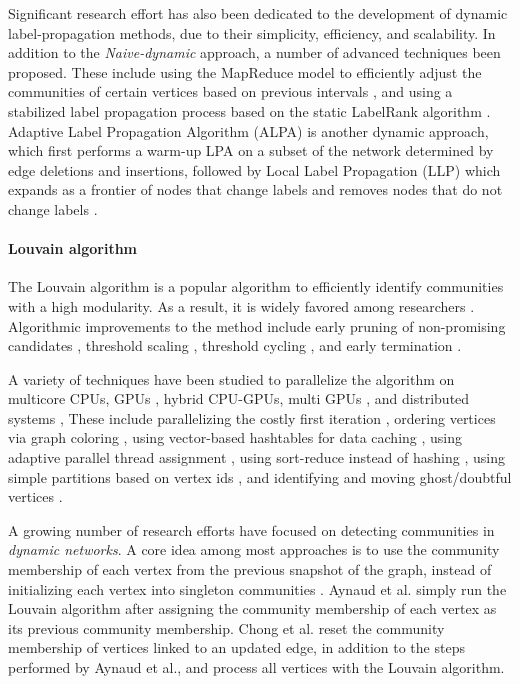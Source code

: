 Significant research effort has also been dedicated to the development of dynamic label-propagation methods, due to their simplicity, efficiency, and scalability. In addition to the \textit{Naive-dynamic} approach, a number of advanced techniques been proposed. These include using the MapReduce model to efficiently adjust the communities of certain vertices based on previous intervals \cite{com-li17}, and using a stabilized label propagation process based on the static LabelRank algorithm \cite{com-xie13}. Adaptive Label Propagation Algorithm (ALPA) is another dynamic approach, which first performs a warm-up LPA on a subset of the network determined by edge deletions and insertions, followed by Local Label Propagation (LLP) which expands as a frontier of nodes that change labels and removes nodes that do not change labels \cite{com-han17}.





\paragraph{Louvain algorithm \cite{com-blondel08}}

The Louvain algorithm is a popular algorithm to efficiently identify communities with a high modularity. As a result, it is widely favored among researchers \cite{com-lancichinetti09}. Algorithmic improvements to the \Lou{} method include early pruning of non-promising candidates \cite{com-halappanavar17}, threshold scaling \cite{com-naim17, com-halappanavar17}, threshold cycling \cite{com-ghosh18}, and early termination \cite{com-ghosh18}.

A variety  of techniques have been studied to parallelize the \Lou{} algorithm on multicore CPUs, GPUs \cite{com-cheong13}, hybrid CPU-GPUs, multi GPUs \cite{com-cheong13, com-bhowmick22}, and distributed systems \cite{com-bhowmick22}, These include parallelizing the costly first iteration \cite{com-wickramaarachchi14}, ordering vertices via graph coloring \cite{com-halappanavar17}, using vector-based hashtables for data caching \cite{com-halappanavar17}, using adaptive parallel thread assignment \cite{com-naim17}, using sort-reduce instead of hashing \cite{com-cheong13}, using simple partitions based on vertex ids \cite{com-cheong13, com-ghosh18}, and identifying and moving ghost/doubtful vertices \cite{com-bhowmick22}.

A growing number of research efforts have focused on detecting communities in \textit{dynamic networks}. A core idea among most approaches is to use the community membership of each vertex from the previous snapshot of the graph, instead of initializing each vertex into singleton communities \cite{com-aynaud10, com-chong13, com-cordeiro16, com-zarayeneh21}. Aynaud et al. \cite{com-aynaud10} simply run the Louvain algorithm after assigning the community membership of each vertex as its previous community membership. Chong et al. \cite{com-chong13} reset the community membership of vertices linked to an updated edge, in addition to the steps performed by Aynaud et al., and process all vertices with the Louvain algorithm.

